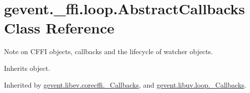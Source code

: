 \hypertarget{classgevent_1_1__ffi_1_1loop_1_1_abstract_callbacks}{}\section{gevent.\+\_\+ffi.\+loop.\+Abstract\+Callbacks Class Reference}
\label{classgevent_1_1__ffi_1_1loop_1_1_abstract_callbacks}


Note on C\+F\+FI objects, callbacks and the lifecycle of watcher objects.  




Inherits object.



Inherited by \hyperlink{classgevent_1_1libev_1_1corecffi_1_1___callbacks}{gevent.\+libev.\+corecffi.\+\_\+\+Callbacks}, and \hyperlink{classgevent_1_1libuv_1_1loop_1_1___callbacks}{gevent.\+libuv.\+loop.\+\_\+\+Callbacks}.

